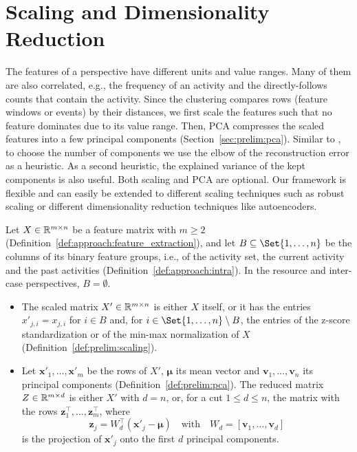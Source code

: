 \section{Scaling and Dimensionality Reduction}
\label{sec:approach:reduction}
The features of a perspective have different units and value ranges. Many of them are also correlated, e.g., the frequency of an activity and the directly-follows counts that contain the activity. Since the clustering compares rows (feature windows or events) by their distances, we first scale the features such that no feature dominates due to its value range. Then, PCA compresses the scaled features into a few principal components (Section~\ref{sec:prelim:pca}). Similar to \textcite{berti2025ocel}, to choose the number of components we use the elbow of the reconstruction error as a heuristic. As a second heuristic, the explained variance of the kept components is also useful. Both scaling and PCA are optional. Our framework is flexible and can easily be extended to different scaling techniques such as robust scaling or different dimensionality reduction techniques like autoencoders.

\begin{definition}
	\label{def:approach:reduction}
	Let $X \in \mathbb R^{m \times n}$ be a feature matrix with $m \ge 2$ (Definition~\ref{def:approach:feature_extraction}), and let $B \subseteq \Set{1, \dots, n}$ be the columns of its binary feature groups, i.e., of the activity set, the current activity and the past activities (Definition~\ref{def:approach:intra}). In the resource and inter-case perspectives, $B = \emptyset$.
	\begin{itemize}
		\item The scaled matrix $X' \in \mathbb R^{m \times n}$ is either $X$ itself, or it has the entries $x'_{j,i} = x_{j,i}$ for $i \in B$ and, for $i \in \Set{1, \dots, n} \setminus B$, the entries of the z-score standardization or of the min-max normalization of $X$ (Definition~\ref{def:prelim:scaling}).
		\item Let $\mathbf{x}'_1, \dots, \mathbf{x}'_m$ be the rows of $X'$, $\boldsymbol{\mu}$ its mean vector and $\mathbf{v}_1, \dots, \mathbf{v}_n$ its principal components (Definition~\ref{def:prelim:pca}). The reduced matrix $Z \in \mathbb R^{m \times d}$ is either $X'$ with $d = n$, or, for a cut $1 \le d \le n$, the matrix with the rows $\mathbf{z}_1^\top, \dots, \mathbf{z}_m^\top$, where
		      \[
			      \mathbf{z}_j = W_d^\top (\mathbf{x}'_j - \boldsymbol{\mu}) \quad\text{with}\quad W_d = [\mathbf{v}_1, \dots, \mathbf{v}_d]
		      \]
		      is the projection of $\mathbf{x}'_j$ onto the first $d$ principal components.
	\end{itemize}
\end{definition}

